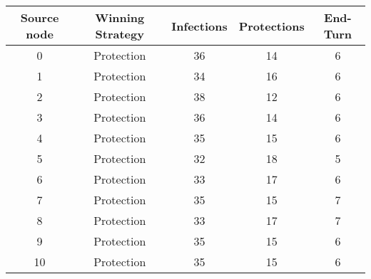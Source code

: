 \documentclass[results.tex]{subfiles}
\begin{document}
    \begin{center}
        \begin{tabular}{| c || c | c | c | c |}
            \hline
            {\bfseries Source node} & {\bfseries Winning Strategy} & {\bfseries Infections} & {\bfseries Protections}
            & {\bfseries End-Turn}
            \\  %
            \hline\hline
            0                       & Protection                   & 36                     & 14                      & 6                    \\
            \hline
            1                       & Protection                   & 34                     & 16                      & 6                    \\
            \hline
            2                       & Protection                   & 38                     & 12                      & 6                    \\
            \hline
            3                       & Protection                   & 36                     & 14                      & 6                    \\
            \hline
            4                       & Protection                   & 35                     & 15                      & 6                    \\
            \hline
            5                       & Protection                   & 32                     & 18                      & 5                    \\
            \hline
            6                       & Protection                   & 33                     & 17                      & 6                    \\
            \hline
            7                       & Protection                   & 35                     & 15                      & 7                    \\
            \hline
            8                       & Protection                   & 33                     & 17                      & 7                    \\
            \hline
            9                       & Protection                   & 35                     & 15                      & 6                    \\
            \hline
            10                      & Protection                   & 35                     & 15                      & 6                    \\

\end{tabular}
\end{center}
\end{document}
